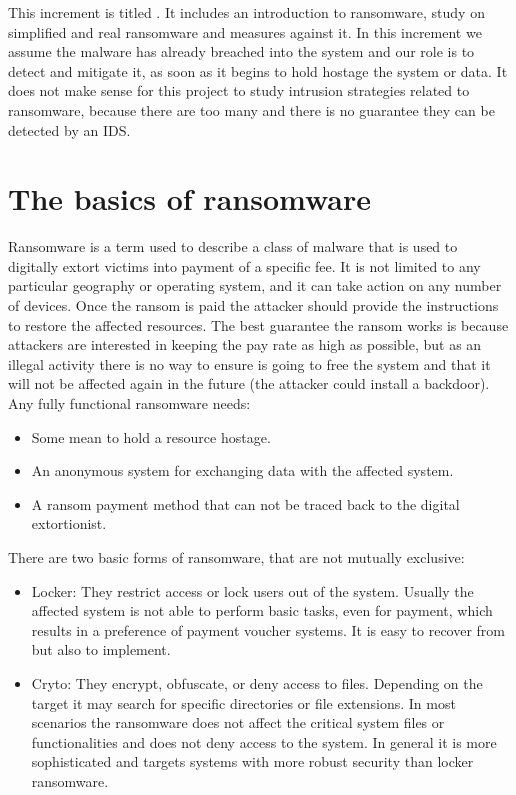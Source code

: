 This increment is titled \textit{\IncrementoTres}.
It includes an introduction to ransomware, study on simplified and real ransomware and measures against it.
\linej
\linej
In this increment we assume the malware has already breached into the system and our role is to detect and mitigate it, as soon as it begins to hold hostage the system or data.
It does not make sense for this project to study intrusion strategies related to ransomware, because there are too many and there is no guarantee they can be detected by an IDS.

\section{The basics of ransomware}
Ransomware is a term used to describe a class of malware that is used to digitally extort victims into payment of a specific fee.
It is not limited to any particular geography or operating system, and it can take action on any number of devices\cite{ransomware_oReilly}.
\linej
Once the ransom is paid the attacker should provide the instructions to restore the affected resources.
The best guarantee the ransom works is because attackers are interested in keeping the pay rate as high as possible, but as an illegal activity there is no way to ensure is going to free the system and that it will not be affected again in the future (the attacker could install a backdoor).
\linej
\linej
Any fully functional ransomware needs\cite{ransomware_digital_extortion}:
\begin{itemize}
\item Some mean to hold a resource hostage.
\item An anonymous system for exchanging data with the affected system.
\item A ransom payment method that can not be traced back to the digital extortionist.
\end{itemize}
\linej
There are two basic forms of ransomware, that are not mutually exclusive\cite{ransomware_oReilly}\cite{ransomware_digital_extortion}:
\begin{itemize}
	\item Locker: They restrict access or lock users out of the system.
	Usually the affected system is not able to perform basic tasks, even for payment, which results in a preference of payment voucher systems.
	It is easy to recover from but also to implement.
	\item Cryto: They encrypt, obfuscate, or deny access to files.
	Depending on the target it may search for specific directories or file extensions.
	In most scenarios the ransomware does not affect the critical system files or functionalities and does not deny access to the system.
	In general it is more sophisticated and targets systems with more robust security than locker ransomware.
\end{itemize}
